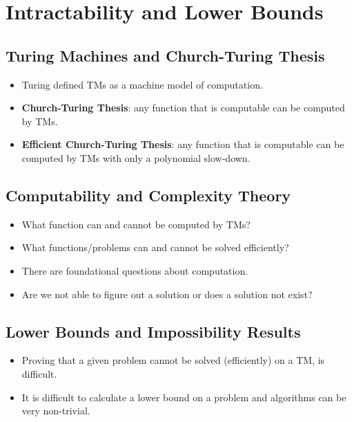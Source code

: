 \documentclass[12pt]{article}
\date{April 15, 2021}
\begin{document}
\maketitle

\section{Intractability and Lower Bounds}

\subsection{Turing Machines and Church-Turing Thesis}
\begin{itemize}
    \item Turing defined TMs as a machine model of computation.
    \item \textbf{Church-Turing Thesis}: any function that is computable can be computed by TMs.
    \item \textbf{Efficient Church-Turing Thesis}: any function that is computable can be computed by TMs with only a polynomial slow-down.
\end{itemize}

\subsection{Computability and Complexity Theory}
\begin{itemize}
    \item What function can and cannot be computed by TMs?
    \item What functions/problems can and cannot be solved efficiently?
    \item There are foundational questions about computation.
    \item Are we not able to figure out a solution or does a solution not exist?
\end{itemize}

\subsection{Lower Bounds and Impossibility Results}
\begin{itemize}
    \item Proving that a given problem cannot be solved (efficiently) on a TM, is difficult. 
    \item It is difficult to calculate a lower bound on a problem and algorithms can be very non-trivial.
\end{itemize}
\end{document}
